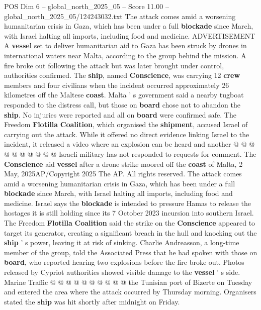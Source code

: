 \begin{textsample}{POS Dim 6 – global\_north\_2025\_05 – Score 11.00 – global\_north\_2025\_05/124243032.txt}  \label{ex:f6_pos_049}
The attack comes amid a worsening humanitarian crisis in Gaza, which has been under a full \textbf{blockade} since March, with Israel halting all imports, including food and medicine.
ADVERTISEMENT A \textbf{vessel} set to deliver humanitarian aid to Gaza has been struck by drones in international waters near Malta, according to the group behind the mission.
A fire broke out following the attack but was later brought under control, authorities confirmed.
The \textbf{ship}, named \textbf{Conscience}, was carrying 12 \textbf{crew} members and four civilians when the incident occurred approximately 26 kilometres off the Maltese \textbf{coast}.
Malta ' s government said a nearby tugboat responded to the distress call, but those on \textbf{board} chose not to abandon the \textbf{ship}.
No injuries were reported and all on \textbf{board} were confirmed safe.
The Freedom \textbf{Flotilla} \textbf{Coalition}, which organised the \textbf{shipment}, accused Israel of carrying out the attack.
While it offered no direct evidence linking Israel to the incident, it released a video where an explosion can be heard and another @ @ @ @ @ @ @ @ @ @ Israeli military has not responded to requests for comment.
The \textbf{Conscience} aid \textbf{vessel} after a drone strike moored off the \textbf{coast} of Malta, 2 May, 2025AP/Copyright 2025 The AP.
All rights reserved.
The attack comes amid a worsening humanitarian crisis in Gaza, which has been under a full \textbf{blockade} since March, with Israel halting all imports, including food and medicine.
Israel says the \textbf{blockade} is intended to pressure Hamas to release the hostages it is still holding since its 7 October 2023 incursion into southern Israel.
The Freedom \textbf{Flotilla} \textbf{Coalition} said the strike on the \textbf{Conscience} appeared to target its generator, creating a significant breach in the hull and knocking out the \textbf{ship} ' s power, leaving it at risk of sinking.
Charlie Andreasson, a long-time member of the group, told the Associated Press that he had spoken with those on \textbf{board}, who reported hearing two explosions before the fire broke out.
Photos released by Cypriot authorities showed visible damage to the \textbf{vessel} ' s side.
Marine Traffic @ @ @ @ @ @ @ @ @ @ the Tunisian port of Bizerte on Tuesday and entered the area where the attack occurred by Thursday morning.
Organisers stated the \textbf{ship} was hit shortly after midnight on Friday.

\end{textsample}
